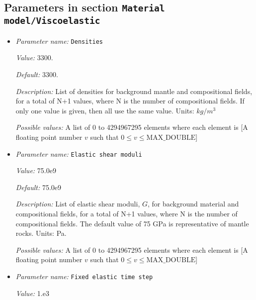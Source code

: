 \subsection{Parameters in section \tt Material model/Viscoelastic}
\label{parameters:Material_20model/Viscoelastic}

\begin{itemize}
\item {\it Parameter name:} {\tt Densities}
\label{parameters:Material model/Viscoelastic/Densities}
\label{parameters:Material_20model/Viscoelastic/Densities}


{\it Value:} 3300.


{\it Default:} 3300.


{\it Description:} List of densities for background mantle and compositional fields, for a total of N+1 values, where N is the number of compositional fields. If only one value is given, then all use the same value.  Units: $kg / m^3$


{\it Possible values:} A list of 0 to 4294967295 elements where each element is [A floating point number $v$ such that $0 \leq v \leq \text{MAX\_DOUBLE}$]
\item {\it Parameter name:} {\tt Elastic shear moduli}
\label{parameters:Material model/Viscoelastic/Elastic shear moduli}
\label{parameters:Material_20model/Viscoelastic/Elastic_20shear_20moduli}


{\it Value:} 75.0e9


{\it Default:} 75.0e9


{\it Description:} List of elastic shear moduli, $G$, for background material and compositional fields, for a total of N+1 values, where N is the number of compositional fields. The default value of 75 GPa is representative of mantle rocks. Units: Pa.


{\it Possible values:} A list of 0 to 4294967295 elements where each element is [A floating point number $v$ such that $0 \leq v \leq \text{MAX\_DOUBLE}$]
\item {\it Parameter name:} {\tt Fixed elastic time step}
\label{parameters:Material model/Viscoelastic/Fixed elastic time step}
\label{parameters:Material_20model/Viscoelastic/Fixed_20elastic_20time_20step}


{\it Value:} 1.e3



\end{itemize}
